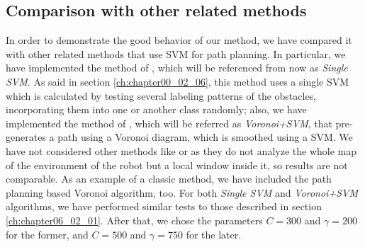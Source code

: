 \subsection{Comparison with other related methods}\label{ch:chapter06_02_02}

In order to demonstrate the good behavior of our method, we have compared it with other related methods that use \ac{SVM} for path planning. In particular, we have implemented the method of \cite{miura2006support}, which will be referenced from now as \textit{Single \ac{SVM}}. As said in section \ref{ch:chapter00_02_06}, this method uses a single \ac{SVM} which is calculated by testing several labeling patterns of the obstacles, incorporating them into one or another class randomly; also, we have implemented the method of \cite{yang2012safe}, which will be referred as \textit{Voronoi+\ac{SVM}}, that pre-generates a path using a Voronoi diagram, which is smoothed using a \ac{SVM}. We have not considered other methods like \cite{sarkar2008mobile} or \cite{qingyang2012local} as they do not analyze the whole map of the environment of the robot but a local window inside it, so results are not comparable. As an example of a classic method, we have included the path planning based Voronoi algorithm, too.
For both \textit{Single \ac{SVM}} and \textit{Voronoi+\ac{SVM}} algorithms, we have performed similar tests to those described in section \ref{ch:chapter06_02_01}. After that, we chose the parameters $C=300$ and $\gamma=200$ for the former, and $C=500$ and $\gamma=750$ for the later.


